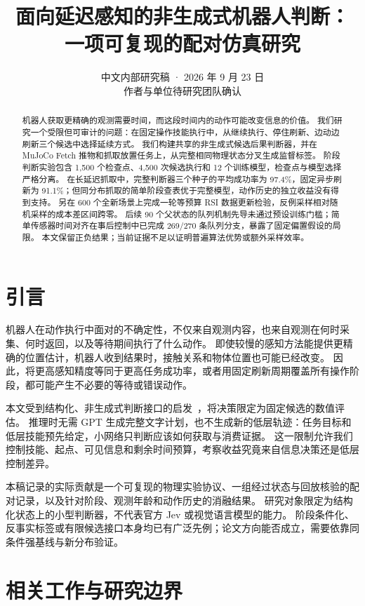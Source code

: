 \documentclass{article}
\title{面向延迟感知的非生成式机器人判断：\\一项可复现的配对仿真研究}
\author{中文内部研究稿 · 2026 年 9 月 23 日\\作者与单位待研究团队确认}
\begin{document}
\maketitle
\begin{abstract}
机器人获取更精确的观测需要时间，而这段时间内的动作可能改变信息的价值。
我们研究一个受限但可审计的问题：在固定操作技能执行中，从继续执行、停住刷新、边动边刷新三个候选中选择延续方式。
我们构建共享的非生成式候选后果判断器，并在 MuJoCo Fetch 推物和抓取放置任务上，从完整相同物理状态分叉生成监督标签。
阶段判断实验包含 1,500 个检查点、4,500 次候选执行和 12 个训练模型，检查点与模型选择严格分离。
在长延迟抓取中，完整判断器三个种子的平均成功率为 97.4\%，固定异步刷新为 91.1\%；但同分布抓取的简单阶段查表优于完整模型，动作历史的独立收益没有得到支持。
另在 600 个全新场景上完成一轮等预算 RSI 数据更新检验，反例采样相对随机采样的成本差区间跨零。
后续 90 个父状态的队列机制先导未通过预设训练门槛；简单传感器时间对齐在事后控制中已完成 269/270 条队列分支，暴露了固定偏置假设的局限。
本文保留正负结果；当前证据不足以证明普遍算法优势或额外采样效率。
\end{abstract}

\section{引言}
机器人在动作执行中面对的不确定性，不仅来自观测内容，也来自观测在何时采集、何时返回，以及等待期间执行了什么动作。
即使较慢的感知方法能提供更精确的位置估计，机器人收到结果时，接触关系和物体位置也可能已经改变。
因此，将更高感知精度等同于更高任务成功率，或者用固定刷新周期覆盖所有操作阶段，都可能产生不必要的等待或错误动作。

本文受到结构化、非生成式判断接口的启发~\citep{jev2026}，将决策限定为固定候选的数值评估。
推理时无需 GPT 生成完整文字计划，也不生成新的低层轨迹：任务目标和低层技能预先给定，小网络只判断应该如何获取与消费证据。
这一限制允许我们控制技能、起点、可见信息和剩余时间预算，考察收益究竟来自信息决策还是低层控制差异。

本稿记录的实际贡献是一个可复现的物理实验协议、一组经过状态与回放核验的配对记录，以及针对阶段、观测年龄和动作历史的消融结果。
研究对象限定为结构化状态上的小型判断器，不代表官方 Jev 或视觉语言模型的能力。
阶段条件化、反事实标签或有限候选接口本身均已有广泛先例；论文方向能否成立，需要依靠同条件强基线与新分布验证。

\section{相关工作与研究边界}
\end{document}
